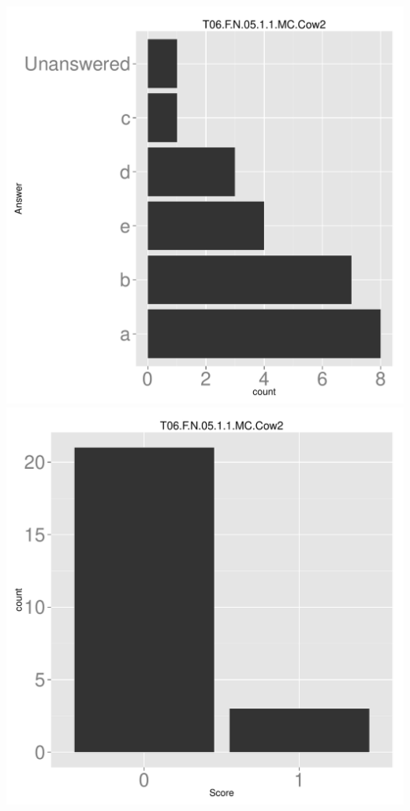 \documentclass[12pt,nohyper]{tufte-handout}\usepackage[]{graphicx}\usepackage[]{color}
\begin{document}
\begin{center} \includegraphics[width=.45\linewidth]{Topic06_54_answer} \includegraphics[width=.45\linewidth]{Topic06_54_score} \end{center} 
\end{document}
